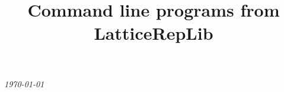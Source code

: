 \documentclass[preprint]{iucr}              %
\numberwithin{equation}{section}
\begin{document}
	
	
	
	
	
	
	
	
	
	
	
	{\LARGE \emph{\today}} \\
	\title{Command line programs from LatticeRepLib}
	
	
\end{document}
